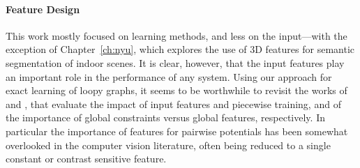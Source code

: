 \documentclass[12pt,toc=bibnumbered, a4paper,twoside,DIV=11,BCOR=1cm]{scrbook}
\begin{document}
\paragraph{Feature Design}
This work mostly focused on learning methods, and less on the input---with
the exception of Chapter~\ref{ch:nyu}, which explores the use of 3D features
for semantic segmentation of indoor scenes. It is clear, however, that
the input features play an important role in the performance of any system.
Using our approach for exact learning of loopy graphs, it seems to be worthwhile to
revisit the works of \citet{nowozin2010parameter} and \citet{lucchi2011spatial},
that evaluate the impact of input features and piecewise training, and of the importance
of global constraints versus global features, respectively.
In particular the importance of features for pairwise potentials has been
somewhat overlooked in the computer vision literature, often being reduced to a
single constant or contrast sensitive feature.



\end{document}
